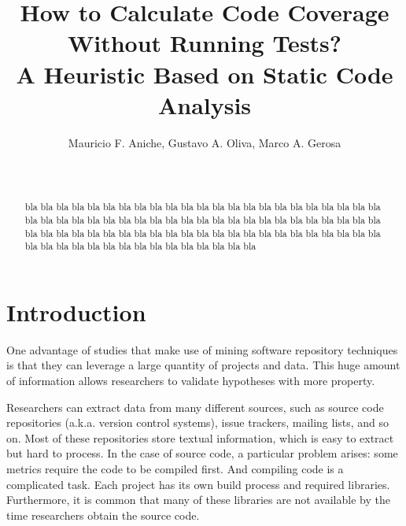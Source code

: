 \documentclass{sig-alternate}
\begin{document}

\title{How to Calculate Code Coverage Without Running Tests?\\
A Heuristic Based on Static Code Analysis}


\author{
\alignauthor
Mauricio F. Aniche, Gustavo A. Oliva, Marco A. Gerosa\\
\\
\\
}

\maketitle
\begin{abstract}

bla bla bla bla bla bla bla bla bla bla bla bla bla bla bla bla bla bla bla bla bla bla bla bla
bla bla bla bla bla bla bla bla bla bla bla bla
bla bla bla bla bla bla bla bla bla bla bla bla
bla bla bla bla bla bla bla bla bla bla bla bla
bla bla bla bla bla bla bla bla bla bla bla bla
bla bla bla bla bla bla bla bla bla bla bla bla


\end{abstract}

\section{Introduction}

One advantage of studies that make use of mining software repository techniques
is that they can leverage a large quantity of projects and data. This huge
amount of information allows researchers to validate hypotheses with more property.

Researchers can extract data from many different sources, such as source code repositories (a.k.a. version control systems), issue trackers, mailing lists, and so on. Most of these repositories store textual information, which is easy to extract but hard to process. In the case of source code, a particular problem arises: some metrics require the code to be compiled first. And compiling code is a complicated task. Each project has its own build process and required libraries. Furthermore, it is common that many of these libraries are not available by the time researchers obtain the source code.
\end{document}
